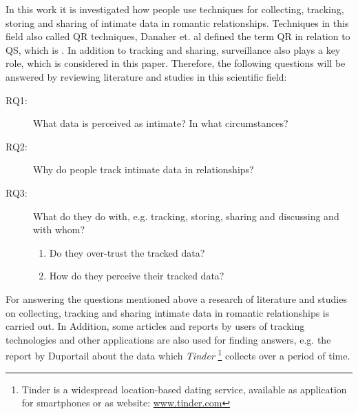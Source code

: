 In this work it is investigated how people use techniques for collecting, tracking, storing and sharing of intimate data in romantic relationships. Techniques in this field also called \ac{QR} techniques, Danaher et. al \cite{doi:10.1080/15265161.2017.1409823} defined the term \acs{QR} in relation to \ac{QS}, which is . In addition to tracking and sharing, surveillance also plays a key role, which is considered in this paper.
Therefore, the following questions will be answered by reviewing literature and studies in this scientific field:
 \begin{description}
 	\item[RQ1:] What data is perceived as intimate? In what circumstances?
 	\item[RQ2:] Why do people track intimate data in relationships?
 	\item[RQ3:] What do they do with, e.g. tracking, storing, sharing and discussing and with whom?
 	\begin{enumerate}
 		\item Do they over-trust the tracked data?
 		\item How do they perceive their tracked data?
 	\end{enumerate}
 \end{description}
For answering the questions mentioned above a research of literature and studies on collecting, tracking and sharing intimate data in romantic relationships is carried out. In Addition, some articles and reports by users of tracking technologies and other applications are also used for finding answers, e.g. the report by Duportail \cite{Duportail2017} about the data which \textit{Tinder} \footnote{Tinder is a widespread location-based dating service, available as application for smartphones or as website: \url{www.tinder.com}} collects over a period of time.

